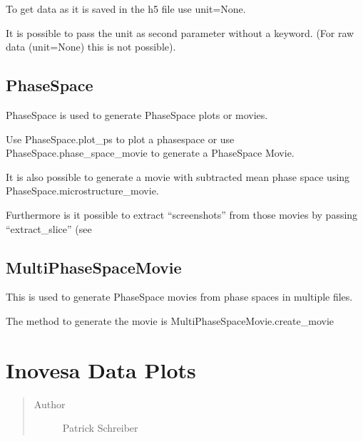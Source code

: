 \documentclass[letterpaper,10pt,openany,oneside,english]{sphinxmanual}
\begin{document}
To get data as it is saved in the h5 file use unit=None.

It is possible to pass the unit as second parameter without a keyword. (For raw data (unit=None) this is not possible).


\section{PhaseSpace}
\label{\detokenize{simpleusage:phasespace}}
PhaseSpace is used to generate PhaseSpace plots or movies.

Use PhaseSpace.plot\_ps to plot a phasespace or use PhaseSpace.phase\_space\_movie to generate a PhaseSpace Movie.

It is also possible to generate a movie with subtracted mean phase space using PhaseSpace.microstructure\_movie.

Furthermore is it possible to extract “screenshots” from those movies by passing “extract\_slice” (see


\section{MultiPhaseSpaceMovie}
\label{\detokenize{simpleusage:multiphasespacemovie}}
This is used to generate PhaseSpace movies from phase spaces in multiple files.

The method to generate the movie is MultiPhaseSpaceMovie.create\_movie
\label{\detokenize{plots:module-plots}}

\chapter{Inovesa Data Plots}
\label{\detokenize{plots:plots}}\label{\detokenize{plots::doc}}\label{\detokenize{plots:inovesa-data-plots}}\begin{quote}\begin{description}
\item[{Author}] \leavevmode
Patrick Schreiber

\end{description}\end{quote}

\begin{fulllineitems}
\label{\detokenize{plots:plots.warn}}
\end{fulllineitems}
\end{document}
